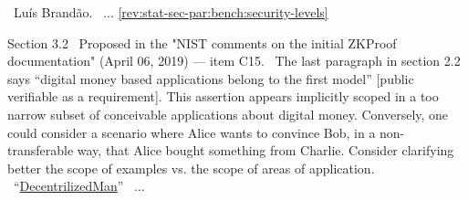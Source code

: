 \newcol {}
\newcol \contributors\ Luís Brandão.
				\Chan\ ...
\newcol \ref{rev:stat-sec-par:bench:security-levels}
\rowendL
\myendIssue



Section 3.2
\newcol \ccontext\ Proposed in the "NIST comments on the initial ZKProof documentation" (April 06, 2019) --- item C15.
				\propContrib\ The last paragraph in section 2.2 says ``digital money based applications belong to the first model'' [public verifiable as a requirement]. This assertion appears implicitly scoped in a too narrow subset of conceivable applications about digital money. Conversely, one could consider a scenario where Alice wants to convince Bob, in a non-transferable way, that Alice bought something from Charlie. Consider clarifying better the scope of examples vs. the scope of areas of application.
\newcol {}
\newcol \contributors\ ``\href{https://github.com/DecentrilizedMan}{DecentrilizedMan}''  %
				\Chan\ ...
\newcol %
\rowendL
\myendIssue



